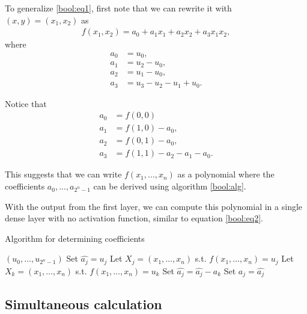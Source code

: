 \documentclass{somasmsc}
\begin{document}
To generalize \ref{bool:eq1}, first note that we can rewrite it with $\left(x, y\right) = \left(x_1, x_2\right)$ as
\begin{align*}
f\left(x_1, x_2\right) = a_0 + a_1 x_1 + a_2 x_2 + a_3 x_1 x_2,
\end{align*}
where
\begin{align*}
a_0 &= u_0, \\
a_1 &= u_2 - u_0, \\
a_2 &= u_1 - u_0, \\
a_3 &= u_3 - u_2 - u_1 + u_0.
\end{align*}

Notice that
\begin{align*}
a_0 &= f\left(0, 0\right) \\
a_1 &= f\left(1, 0\right) - a_0, \\
a_2 &= f\left(0, 1\right) - a_0, \\
a_3 &= f\left(1, 1\right) - a_2 - a_1 - a_0.
\end{align*}

This suggests that we can write $f\left(x_1, ..., x_n\right)$ as a polynomial where the coefficients $a_0, ..., a_{2^n-1}$ can be derived using algorithm \ref{bool:alg}.

With the output from the first layer, we can compute this polynomial in a single dense layer with no activation function, similar to equation \ref{bool:eq2}.

\newpage

\begin{algorithm}
\caption{Algorithm for determining coefficients}\label{bool:alg}
\begin{algorithmic}
\Require $\left(u_0, \dots, u_{2^n-1}\right)$
  \State Set $\hat{a_j} = u_j$
  \State Let $X_j = \left(x_1, \dots, x_n\right)$ s.t. $f\left(x_1, \dots, x_n\right) = u_j$
    \State Let $X_k = \left(x_1, \dots, x_n\right)$ s.t. $f\left(x_1, \dots, x_n\right) = u_k$
      \State Set $\hat{a_j} = \hat{a_j} - a_k$
    \EndIf
  \EndFor
  \State Set $a_j = \hat{a_j}$
\EndFor
\State {}
\end{algorithmic}
\end{algorithm}

\subsection{Simultaneous calculation}\label{bool:sim}
\end{document}

